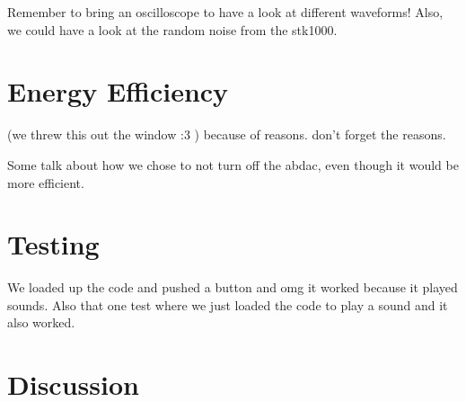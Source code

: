 

Remember to bring an oscilloscope to have a look at different waveforms! Also, we could have a look at the random noise from the stk1000.

\section{Energy Efficiency}

(we threw this out the window :3 )
because of reasons. don't forget the reasons.

Some talk about how we chose to not turn off the abdac, even though it would be more efficient.


\section{Testing}
We loaded up the code and pushed a button and omg it worked because it played sounds.
Also that one test where we just loaded the code to play a sound and it also worked.


\section{Discussion}
